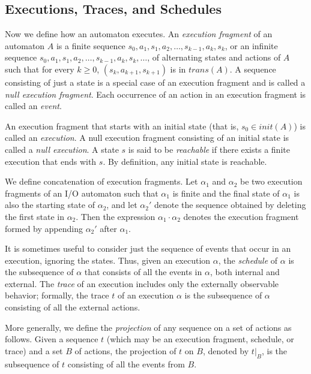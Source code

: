 \documentclass[11pt]{article}
\numberwithin{theorem}{section}
\begin{document}
\subsection{Executions, Traces, and Schedules}

Now we define how an automaton executes. 
An \emph{execution fragment} of an automaton $A$ is a finite sequence
$s_0,a_1,s_1,a_2,\ldots,s_{k-1},a_k,s_{k}$, or an infinite sequence
$s_0,a_1,s_1,a_2,\ldots,s_{k-1},a_k,s_{k},\ldots$, of alternating
states and actions of $A$ such that for every $k \geq 0$, $(s_k,a_{k+1},s_{k+1})$ is in $trans(A)$.
A sequence consisting of just a state is a special case of an
execution fragment and is called a \emph{null execution fragment}. 
Each occurrence of an action in an execution fragment is called an 
\emph{event}. 

An execution fragment that starts with an initial state (that is, $s_0
\in init(A)$) is called an \emph{execution}. 
A null execution fragment consisting of an initial state is called a
\emph{null execution}.
A state $s$ is said to be \emph{reachable} if there exists a finite
execution that ends with $s$. 
By definition, any initial state is reachable.

We define concatenation of execution fragments.
Let $\alpha_1$ and $\alpha_2$ be two execution fragments of an I/O
automaton such that $\alpha_1$ is finite and the final state of
$\alpha_1$ is also the starting state of $\alpha_2$, and let
$\alpha_2'$ denote the sequence obtained by deleting the first state
in $\alpha_2$. 
Then the expression $\alpha_1 \cdot \alpha_2$ denotes the execution
fragment formed by appending $\alpha_2'$ after $\alpha_1$.

It is sometimes useful to consider just the sequence of events that
occur in an execution, ignoring the states.
Thus, given an execution $\alpha$, the \emph{schedule} of $\alpha$ is
the subsequence of $\alpha$ that consists of all the events in
$\alpha$, both internal and external.
The \emph{trace} of an execution includes only the externally
observable behavior;
formally, the trace $t$ of an execution $\alpha$ is the subsequence of
$\alpha$ consisting of all the external actions. 

More generally, we define the \emph{projection} of any sequence on a
set of actions as follows.
Given a sequence $t$ (which may be an execution fragment, schedule, or
trace) and a set $B$ of actions, the projection of $t$ on $B$, denoted
by $t|_B$, is the subsequence of $t$ consisting of all the events from
$B$.
\end{document}
